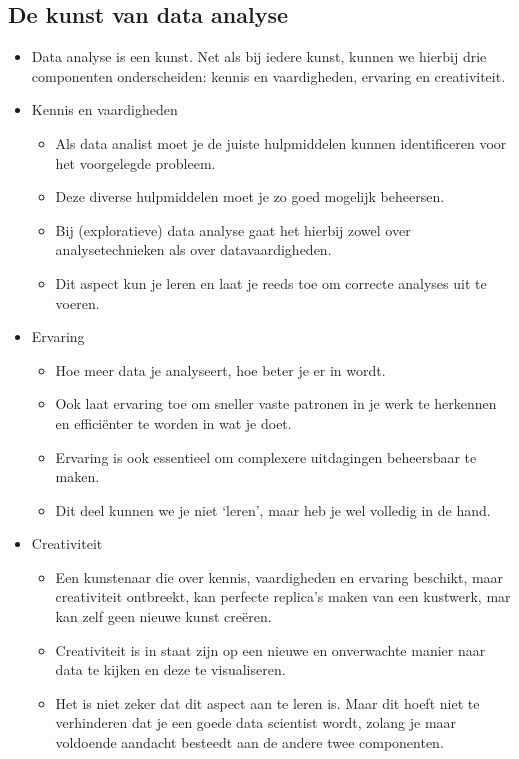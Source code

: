 \documentclass[]{tufte-book}
\providecommand{\tightlist}{%
  \setlength{\itemsep}{0pt}\setlength{\parskip}{0pt}}
\begin{document}
\hypertarget{de-kunst-van-data-analyse}{%
\subsection{De kunst van data analyse}\label{de-kunst-van-data-analyse}}

\begin{itemize}
\tightlist
\item
  Data analyse is een kunst. Net als bij iedere kunst, kunnen we hierbij drie componenten onderscheiden: kennis en vaardigheden, ervaring en creativiteit.
\item
  Kennis en vaardigheden

  \begin{itemize}
  \tightlist
  \item
    Als data analist moet je de juiste hulpmiddelen kunnen identificeren voor het voorgelegde probleem.
  \item
    Deze diverse hulpmiddelen moet je zo goed mogelijk beheersen.
  \item
    Bij (exploratieve) data analyse gaat het hierbij zowel over analysetechnieken als over datavaardigheden.
  \item
    Dit aspect kun je leren en laat je reeds toe om correcte analyses uit te voeren.
  \end{itemize}
\item
  Ervaring

  \begin{itemize}
  \tightlist
  \item
    Hoe meer data je analyseert, hoe beter je er in wordt.
  \item
    Ook laat ervaring toe om sneller vaste patronen in je werk te herkennen en efficiënter te worden in wat je doet.
  \item
    Ervaring is ook essentieel om complexere uitdagingen beheersbaar te maken.
  \item
    Dit deel kunnen we je niet `leren', maar heb je wel volledig in de hand.
  \end{itemize}
\item
  Creativiteit

  \begin{itemize}
  \tightlist
  \item
    Een kunstenaar die over kennis, vaardigheden en ervaring beschikt, maar creativiteit ontbreekt, kan perfecte replica's maken van een kustwerk, mar kan zelf geen nieuwe kunst creëren.
  \item
    Creativiteit is in staat zijn op een nieuwe en onverwachte manier naar data te kijken en deze te visualiseren.
  \item
    Het is niet zeker dat dit aspect aan te leren is. Maar dit hoeft niet te verhinderen dat je een goede data scientist wordt, zolang je maar voldoende aandacht besteedt aan de andere twee componenten.
  \end{itemize}
\end{itemize}
\end{document}
